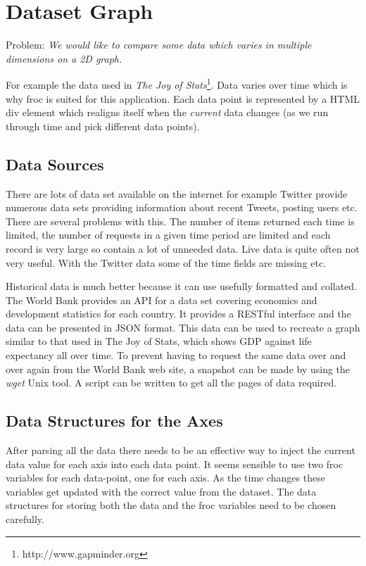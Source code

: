 \section{Dataset Graph}
Problem: \emph{We would like to compare some data which varies in multiple dimensions on a 2D graph.}

For example the data used in \emph{The Joy of Stats}\footnote{http://www.gapminder.org}. Data varies over time which is why froc is suited for this application. Each data point is represented by a HTML div element which realigns itself when the \emph{current} data changes (as we run through time and pick different data points).

\subsection{Data Sources}
There are lots of data set available on the internet for example Twitter provide numerous data sets providing information about recent Tweets, posting users etc. There are several problems with this. The number of items returned each time is limited, the number of requests in a given time period are limited and each record is very large so contain a lot of unneeded data. Live data is quite often not very useful. With the Twitter data some of the time fields are missing etc.

Historical data is much better because it can use usefully formatted and collated. The World Bank provides an API for a data set covering economics and development statistics for each country. It provides a RESTful interface and the data can be presented in JSON format. This data can be used to recreate a graph similar to that used in The Joy of Stats, which shows GDP against life expectancy all over time. To prevent having to request the same data over and over again from the World Bank web site, a snapshot can be made by using the \emph{wget} Unix tool. A script can be written to get all the pages of data required.

\subsection{Data Structures for the Axes}
After parsing all the data there needs to be an effective way to inject the current data value for each axis into each data point. It seems sensible to use two froc variables for each data-point, one for each axis. As the time changes these variables get updated with the correct value from the dataset. The data structures for storing both the data and the froc variables need to be chosen carefully.

